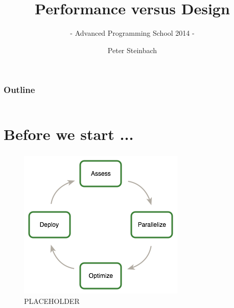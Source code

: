 \documentclass[9pt,xcolor=table]{beamer}
\begin{document}
     
 
 
\title[PerfVsDesign]{Performance versus Design}
\subtitle{- Advanced Programming School 2014 -}
\author[P. Steinbach]{Peter Steinbach}
\date{}
\addtocounter{framenumber}{-1}
\renewcommand*\inserttotalframenumber{XX} 

 
{
\maketitle
}

\begin{frame}[t]
\frametitle{Outline}
\vspace{-1.5\baselineskip}
\begin{columns}[t]
  \begin{column}{.1\textwidth}
    \hfill
  \end{column}
  \begin{column}{.75\textwidth}
    \huge
    \tableofcontents[hideallsubsections]
  \end{column}
  \begin{column}{.1\textwidth}
    \hfill
  \end{column}
\end{columns}
\end{frame}

\section*[Disclaimer]{Before we start ...}
\begin{frame}
\frametitle{\insertsection{}}
\begin{figure}[htb]
\includegraphics[height=0.65\textheight]{img/apod-cycle_placeholder}\\PLACEHOLDER
\end{figure}
\end{frame}
\end{document}
